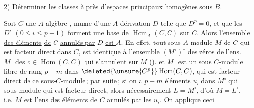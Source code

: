 2) Déterminer les classes à  près d'espaces  principaux homogènes sous $B$.


Soit $C$ une $A$-algèbre , munie d'une $A$-dérivation $D$ telle que $D^p=0$, et que les $D^i$ $(0\leq i\leq p-1)$ forment une \uline{base} de $\operatorname{Hom}_A(C,C)$ sur $C$.
Alors l'\uline{ensemble des éléments} \uline{de} $C$ \uline{annulés par} $D$ \uline{est $A$}. 
En effet, tout sous-$A$-module $M$ de $C$ qui est  facteur direct  dans $C$,
est identique à l'ensemble $(M^\circ)^\circ$ des zéros de l'ens. $M^\circ$ des $v\in\operatorname{Hom}(C,C)$ qui s'annulent sur $M$ (), et $M^\circ$ est un sous $C$-module libre de rang $p-m$ dans $\deleted{\unsure{C^p}}\operatorname{Hom}(C,C)$,
 qui est facteur direct de ce sous-$C$-module\,; par suite\,; \uline{si}
on a $p-m$ éléments $u_i$ dans $M^\circ$ qui   sous-module   qui est facteur direct,
alors nécessairement $L=M^\circ$, d'où $M=L^\circ$, i.e. $M$ est l'ens des éléments de $C$ annulés par les $u_i$. On applique ceci
